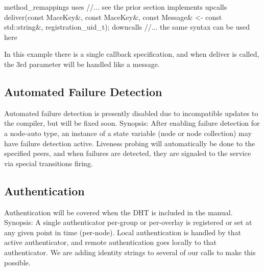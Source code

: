 \begin{programlisting}
method_remappings {
  uses {
    //... see the prior section
  }
  implements {
    upcalls {
      deliver(const MaceKey&, const MaceKey&, const Message& <- const std::string&,
              registration_uid_t);
    }
    downcalls {
      //... the same syntax can be used here
    }
  }
}
\end{programlisting}

In this example there is a single callback specification, and when deliver is
called, the 3rd parameter will be handled like a message.

\subsection{Automated Failure Detection}
\label{sec:failure}

Automated failure detection is presently disabled due to incompatible updates
to the compiler, but will be fixed soon.  Synopsis: After enabling failure
detection for a node-auto type, an instance of a state variable (node or node
collection) may have failure detection active.  Liveness probing will
automatically be done to the specified peers, and when failures are detected,
they are signaled to the service via special transitions firing.

\subsection{Authentication}
\label{sec:authentication}

Authentication will be covered when the DHT is included in the manual.
Synopsis: A single authenticator per-group or per-overlay is registered or set
at any given point in time (per-node).  Local authentication is handled by that
active authenticator, and remote authentication goes locally to that
authenticator.  We are adding identity strings to several of our calls to make
this possible.

